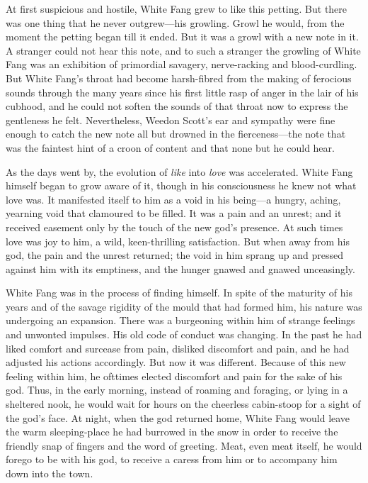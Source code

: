 \documentclass[10pt]{book}
\begin{document}
At first suspicious and hostile, White Fang grew to like this petting.
But there was one thing that he never outgrew—his growling. Growl he
would, from the moment the petting began till it ended. But it was a
growl with a new note in it. A stranger could not hear this note, and
to such a stranger the growling of White Fang was an exhibition of
primordial savagery, nerve-racking and blood-curdling. But White Fang’s
throat had become harsh-fibred from the making of ferocious sounds
through the many years since his first little rasp of anger in the lair
of his cubhood, and he could not soften the sounds of that throat now
to express the gentleness he felt. Nevertheless, Weedon Scott’s ear and
sympathy were fine enough to catch the new note all but drowned in the
fierceness—the note that was the faintest hint of a croon of content
and that none but he could hear.

As the days went by, the evolution of \emph{like} into \emph{love} was
accelerated. White Fang himself began to grow aware of it, though in
his consciousness he knew not what love was. It manifested itself to
him as a void in his being—a hungry, aching, yearning void that
clamoured to be filled. It was a pain and an unrest; and it received
easement only by the touch of the new god’s presence. At such times
love was joy to him, a wild, keen-thrilling satisfaction. But when away
from his god, the pain and the unrest returned; the void in him sprang
up and pressed against him with its emptiness, and the hunger gnawed
and gnawed unceasingly.

White Fang was in the process of finding himself. In spite of the
maturity of his years and of the savage rigidity of the mould that had
formed him, his nature was undergoing an expansion. There was a
burgeoning within him of strange feelings and unwonted impulses. His
old code of conduct was changing. In the past he had liked comfort and
surcease from pain, disliked discomfort and pain, and he had adjusted
his actions accordingly. But now it was different. Because of this new
feeling within him, he ofttimes elected discomfort and pain for the
sake of his god. Thus, in the early morning, instead of roaming and
foraging, or lying in a sheltered nook, he would wait for hours on the
cheerless cabin-stoop for a sight of the god’s face. At night, when the
god returned home, White Fang would leave the warm sleeping-place he
had burrowed in the snow in order to receive the friendly snap of
fingers and the word of greeting. Meat, even meat itself, he would
forego to be with his god, to receive a caress from him or to accompany
him down into the town.
\end{document}
